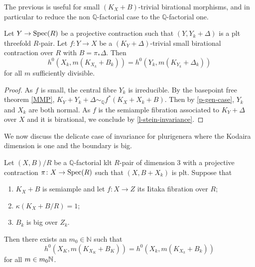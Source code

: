 	The previous is useful for small $(K_{X}+B)$-trivial birational morphisms, and in particular to reduce the non $\mathbb{Q}$-factorial case to the $\mathbb{Q}$-factorial one.
	
	
	\begin{lemma}\label{l-reduce-Q-fac}
		Let $Y \to \operatorname{Spec}(R)$ be a projective contraction such that $(Y,Y_{k}+\Delta)$ is a plt threefold $R$-pair.
		Let $f \colon Y \to X$ be a $(K_{Y}+\Delta)$-trivial small birational contraction over $R$ with $B=\pi_{*}\Delta$. 
		Then
		$$h^{0}(X_{k},m(K_{X_k}+B_{k}))= h^{0}(Y_{k},m(K_{Y_{k}}+\Delta_{k}))$$ 
		for all $m$ sufficiently divisible. 
	\end{lemma}

	\begin{proof}
	
	As $f$ is small, the central fibre $Y_k$ is irreducible. 
	By the basepoint free theorem \autoref{MMP},	$K_Y+Y_k+\Delta \sim_{\mathbb{Q}} f^*(K_X+X_k+B)$.
	Then by \autoref{p-gen-case}, $Y_k$ and $X_k$ are both normal.
	As $f$ is the semiample fibration associated to $K_Y+\Delta$ over $X$ and it is birational, we conclude by \autoref{l-stein-invariance}.
	\end{proof}

	We now discuss the delicate case of invariance for plurigenera where the Kodaira dimension is one and the boundary is big.
	
	
	\begin{proposition}\label{p-1-case}
		
		Let $(X,B)/R$ be a $\mathbb{Q}$-factorial klt $R$-pair of dimension $3$ with a projective contraction $\pi \colon X \to \operatorname{Spec}(R)$ such that $(X,B+X_{k})$ is plt. Suppose that
		\begin{enumerate}
			\item $K_X+B$ is semiample and let $f\colon X \to Z$ its Iitaka fibration over $R$;
			\item $\kappa(K_X+B/R)=1$;
			\item $B_{k}$ is big over $Z_{k}$.
		\end{enumerate}
		Then there exists an $m_{0} \in \mathbb{N}$  such that 
		$$h^0(X_K,m(K_{X_K}+B_K))=h^0(X_k,m(K_{X_k}+B_k))$$
		for all $m\in m_0\mathbb{N}$.	
	\end{proposition}
	
